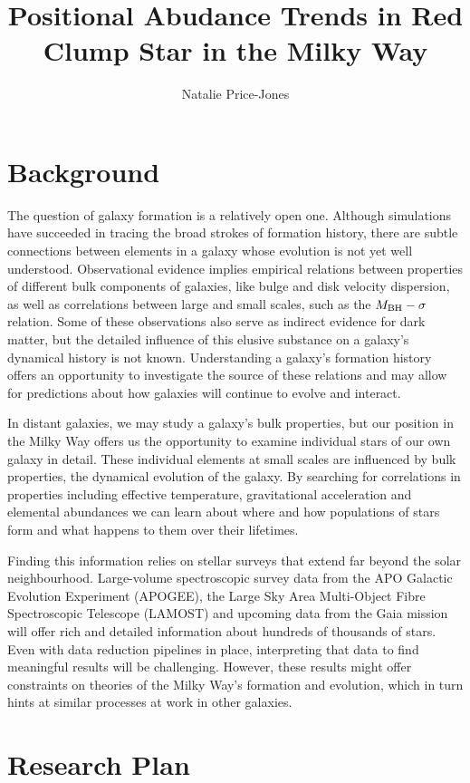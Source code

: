 \documentclass[preprint]{aastex}
\begin{document}
\title{Positional Abudance Trends in Red Clump Star in the Milky Way}
\author{Natalie Price-Jones}

\section{Background}
\label{sec:back}
The question of galaxy formation is a relatively open one. Although simulations have succeeded in tracing the broad strokes of formation history, there are subtle connections between elements in a galaxy whose evolution is not yet well understood. Observational evidence implies empirical relations between properties of different bulk components of galaxies, like bulge and disk velocity dispersion, as well as correlations between large and small scales, such as the $M_{\rm BH}-\sigma$ relation. Some of these observations also serve as indirect evidence for dark matter, but the detailed influence of this elusive substance on a galaxy's dynamical history is not known. Understanding a galaxy's formation history offers an opportunity to investigate the source of these relations and may allow for predictions about how galaxies will continue to evolve and interact.

In distant galaxies, we may study a galaxy's bulk properties, but our position in the Milky Way offers us the opportunity to examine individual stars of our own galaxy in detail. These individual elements at small scales are influenced by bulk properties, the dynamical evolution of the galaxy. By searching for correlations in properties including effective temperature, gravitational acceleration and elemental abundances we can learn about where and how populations of stars form and what happens to them over their lifetimes. 

Finding this information relies on stellar surveys that extend far beyond the solar neighbourhood. Large-volume spectroscopic survey data from the APO Galactic Evolution Experiment (APOGEE), the Large Sky Area Multi-Object Fibre Spectroscopic Telescope (LAMOST) and upcoming data from the Gaia mission will offer rich and detailed information about hundreds of thousands of stars. Even with data reduction pipelines in place, interpreting that data to find meaningful results will be challenging. However, these results might offer constraints on theories of the Milky Way's formation and evolution, which in turn hints at similar processes at work in other galaxies.  


\section{Research Plan}
\label{sec:rp}
\end{document}
